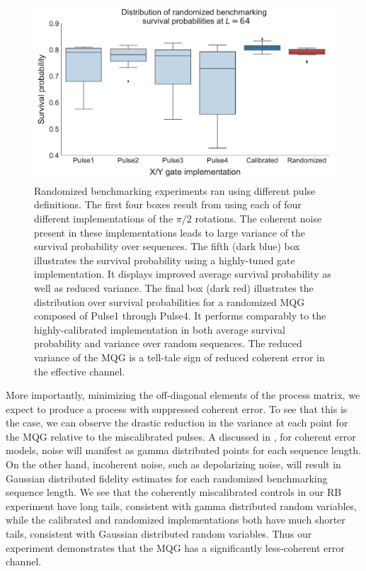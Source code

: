 \documentclass[aps,nofootinbib,pra,notitlepage,twocolumn]{revtex4-1}
\begin{document}
\begin{figure}[t]
  \centering
  \includegraphics[width=\columnwidth]{rb_data.pdf}
  \caption{Randomized benchmarking experiments ran using different pulse definitions. The first four boxes result from using each of four different implementations of the ${\pi/2}$ rotations. The coherent noise present in these implementations leads to large variance of the survival probability over sequences. The fifth (dark blue) box illustrates the survival probability using a highly-tuned gate implementation. It displays improved average survival probability as well as reduced variance. The final box (dark red) illustrates the distribution over survival probabilities for a randomized MQG composed of Pulse1 through Pulse4. It performs comparably to the highly-calibrated implementation in both average survival probability and variance over random sequences. The reduced variance of the MQG is a tell-tale sign of reduced coherent error in the effective channel. }
  \label{fig:rb}
\end{figure}

More importantly, minimizing the off-diagonal elements of the process matrix, we expect to produce a process with suppressed coherent error. To see that this is the case, we can observe the drastic reduction in the variance at each point for the MQG relative to the miscalibrated pulses. A discussed in \cite{Ball2016}, for coherent error models, noise will manifest as gamma distributed points for each sequence length. On the other hand, incoherent noise, such as depolarizing noise, will result in Gaussian distributed fidelity estimates for each randomized benchmarking sequence length. We see that the coherently miscalibrated controls in our RB experiment have long tails, consistent with gamma distributed random variables, while the calibrated and randomized implementations both have much shorter tails, consistent with Gaussian distributed random variables. Thus our experiment demonstrates that the MQG has a significantly less-coherent error channel.
\end{document}
